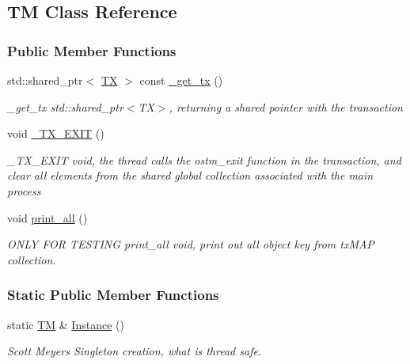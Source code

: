 \hypertarget{a00004}{}\subsection{TM Class Reference}
\label{a00004}
\subsubsection*{Public Member Functions}
\begin{DoxyCompactItemize}
\item 
std\+::shared\+\_\+ptr$<$ \hyperlink{a00005}{TX} $>$ const \hyperlink{a00004_a41cb0226cc4080c931651b13f74a0075}{\+\_\+get\+\_\+tx} ()
\begin{DoxyCompactList}\small\item\em \+\_\+get\+\_\+tx std\+::shared\+\_\+ptr$<$\+T\+X$>$, returning a shared pointer with the transaction \end{DoxyCompactList}\item 
void \hyperlink{a00004_a5e2d1127f2429f2f524d25f430eade06}{\+\_\+\+T\+X\+\_\+\+E\+X\+IT} ()
\begin{DoxyCompactList}\small\item\em \+\_\+\+T\+X\+\_\+\+E\+X\+IT void, the thread calls the ostm\+\_\+exit function in the transaction, and clear all elements from the shared global collection associated with the main process \end{DoxyCompactList}\item 
void \hyperlink{a00004_a1d6891b1d3e71cc0acef54e7afe71c09}{print\+\_\+all} ()
\begin{DoxyCompactList}\small\item\em O\+N\+LY F\+OR T\+E\+S\+T\+I\+NG print\+\_\+all void, print out all object key from tx\+M\+AP collection. \end{DoxyCompactList}\end{DoxyCompactItemize}
\subsubsection*{Static Public Member Functions}
\begin{DoxyCompactItemize}
\item 
static \hyperlink{a00004}{TM} \& \hyperlink{a00004_a7ce5f35e0dae76df4fe116cf905bbe60}{Instance} ()
\begin{DoxyCompactList}\small\item\em Scott Meyer\textquotesingle{}s Singleton creation, what is thread safe. \end{DoxyCompactList}\end{DoxyCompactItemize}


